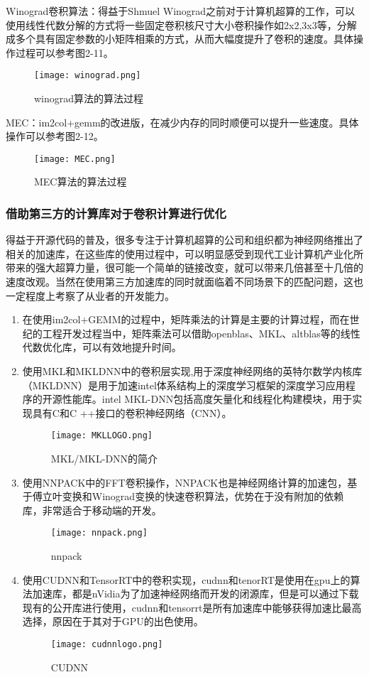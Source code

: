 Winograd卷积算法\cite{WINOGRAD}：得益于Shmuel Winograd\cite{WIKIWINOGRAD}之前对于计算机超算的工作，可以使用线性代数分解的方式将一些固定卷积核尺寸大小卷积操作如2x2,3x3等，分解成多个具有固定参数的小矩阵相乘的方式，从而大幅度提升了卷积的速度。具体操作过程可以参考图2-11。
\begin{figure}[h]
 \centering
	\texttt{[image: winograd.png]}
	\caption{winograd算法的算法过程}
\end{figure}

MEC\cite{MEC}：im2col+gemm的改进版，在减少内存的同时顺便可以提升一些速度。具体操作可以参考图2-12。
\begin{figure}[h]
 \centering
	\texttt{[image: MEC.png]}
	\caption{MEC算法的算法过程}
\end{figure}

\subsubsection{借助第三方的计算库对于卷积计算进行优化}
得益于开源代码的普及，很多专注于计算机超算的公司和组织都为神经网络推出了相关的加速库，在这些库的使用过程中，可以明显感受到现代工业计算机产业化所带来的强大超算力量，很可能一个简单的链接改变，就可以带来几倍甚至十几倍的速度改观。当然在使用第三方加速库的同时就面临着不同场景下的匹配问题，这也一定程度上考察了从业者的开发能力。
\begin{enumerate}
\item 
在使用im2col+GEMM的过程中，矩阵乘法的计算是主要的计算过程，而在世纪的工程开发过程当中，矩阵乘法可以借助openblas、MKL、altblas等的线性代数优化库，可以有效地提升时间。
\item 使用MKL和MKLDNN\cite{MKL}中的卷积层实现,用于深度神经网络的英特尔数学内核库（MKLDNN）是用于加速intel体系结构上的深度学习框架的深度学习应用程序的开源性能库。intel MKL-DNN包括高度矢量化和线程化构建模块，用于实现具有C和C ++接口的卷积神经网络（CNN）。
\begin{figure}[!ht]
 \centering
	\texttt{[image: MKLLOGO.png]}
	\caption{MKL/MKL-DNN的简介}
\end{figure}
\item 使用NNPACK\cite{NNPACK}中的FFT卷积操作，NNPACK也是神经网络计算的加速包，基于傅立叶变换和Winograd变换的快速卷积算法，优势在于没有附加的依赖库，非常适合于移动端的开发。
\begin{figure}[!ht]
 \centering
	\texttt{[image: nnpack.png]}
	\caption{nnpack}
\end{figure}

\item 使用CUDNN\cite{CUDNN}和TensorRT中的卷积实现，cudnn和tenorRT是使用在gpu上的算法加速库，都是nVidia为了加速神经网络而开发的闭源库，但是可以通过下载现有的公开库进行使用，cudnn和tensorrt是所有加速库中能够获得加速比最高选择，原因在于其对于GPU的出色使用。
\begin{figure}[!ht]
 \centering
	\texttt{[image: cudnnlogo.png]}
	\caption{CUDNN}
\end{figure}
\end{enumerate}

